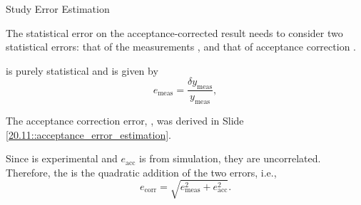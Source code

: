 \begin{frame}{Study Error Estimation}
    \label{20.13::study_error_estimation}

    The statistical error on the acceptance-corrected result  needs to consider two statistical errors: that of the measurements , and that of acceptance correction .

    \vspace{9pt}

     is purely statistical and is given by
    \begin{equation*}
        e_\text{meas} = \frac{\delta y_\text{meas}}{y_\text{meas}},
    \end{equation*}

    \vspace{9pt}

    The acceptance correction error, , was derived in Slide \textcolor{efd_purple}{\ref{20.11::acceptance_error_estimation}}.

    \vspace{9pt}

    Since  is experimental and $e_\text{acc}$ is from simulation, they are uncorrelated.
    Therefore, the  is the quadratic addition of the two errors, i.e.,
    \begin{equation*}
        e_\text{corr} = \sqrt{e_\text{meas}^2 + e_\text{acc}^2}.
    \end{equation*}

\end{frame}

